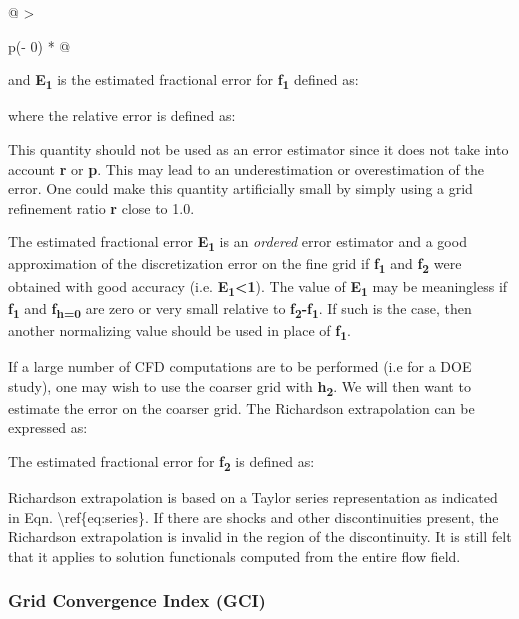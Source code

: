 \begin{longtable}[]{@{}
  >{\raggedright\arraybackslash}p{(\columnwidth - 0\tabcolsep) * }@{}}
\begin{minipage}[t]{\linewidth}
and \textbf{E\textsubscript{1}} is the estimated fractional error for
\textbf{f\textsubscript{1}} defined as:


where the relative error is defined as:


This quantity should not be used as an error estimator since it does not
take into account \textbf{r} or \textbf{p}. This may lead to an
underestimation or overestimation of the error. One could make this
quantity artificially small by simply using a grid refinement ratio
\textbf{r} close to 1.0.

The estimated fractional error \textbf{E\textsubscript{1}} is an
\emph{ordered} error estimator and a good approximation of the
discretization error on the fine grid if \textbf{f\textsubscript{1}} and
\textbf{f\textsubscript{2}} were obtained with good accuracy (i.e.
\textbf{E\textsubscript{1}\textless1}). The value of
\textbf{E\textsubscript{1}} may be meaningless if
\textbf{f\textsubscript{1}} and \textbf{f\textsubscript{h=0}} are zero
or very small relative to
\textbf{f\textsubscript{2}-f\textsubscript{1}}. If such is the case,
then another normalizing value should be used in place of
\textbf{f\textsubscript{1}}.

If a large number of CFD computations are to be performed (i.e for a DOE
study), one may wish to use the coarser grid with
\textbf{h\textsubscript{2}}. We will then want to estimate the error on
the coarser grid. The Richardson extrapolation can be expressed as:


The estimated fractional error for \textbf{f\textsubscript{2}} is
defined as:


Richardson extrapolation is based on a Taylor series representation as
indicated in Eqn. \textbackslash ref\{eq:series\}. If there are shocks
and other discontinuities present, the Richardson extrapolation is
invalid in the region of the discontinuity. It is still felt that it
applies to solution functionals computed from the entire flow field.

\hypertarget{grid-convergence-index-gci}{%
\subsubsection{Grid Convergence Index
(GCI)}\label{grid-convergence-index-gci}}


\end{minipage}
\end{longtable}

